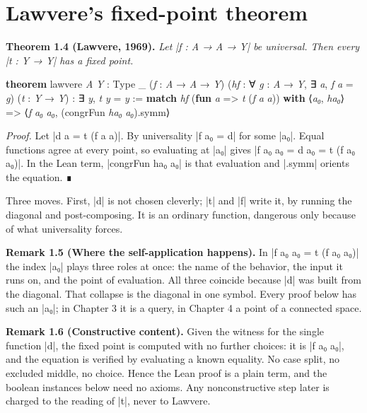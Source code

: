 \documentclass{memoir}
\begin{document}
\section{Lawvere's fixed-point theorem}\label{Two--Schemas--of--Impossibility-005F-005F-005F--Machine--Checked--Limits--of--Trustworthy--Machine--Learning-005F-005F-005F--and--Why--They--Tighten--with--Capability----The--Diagonal----Lawvere-005F-005F-005Fs--fixed--point--theorem}

\textbf{Theorem 1.4 (Lawvere, 1969).} \emph{Let \LeanVerb|f : A → A → Y| be universal. Then every
\LeanVerb|t : Y → Y| has a fixed point.}

\begin{LeanVerbatim}
\textbf{theorem} lawvere \textit{A} \textit{Y} : Type _ (\textit{f} : \textit{A} → \textit{A} → \textit{Y})
    (\textit{hf} : ∀ \textit{g} : \textit{A} → \textit{Y}, ∃ \textit{a}, \textit{f} \textit{a} = \textit{g})
    (\textit{t} : \textit{Y} → \textit{Y}) : ∃ \textit{y}, \textit{t} \textit{y} = \textit{y} :=
  \textbf{match} \textit{hf} (\textbf{fun} \textit{a} => \textit{t} (\textit{f} \textit{a} \textit{a})) \textbf{with}
   ⟨\textit{a₀}, \textit{ha₀}⟩ => ⟨\textit{f} \textit{a₀} \textit{a₀}, (congrFun \textit{ha₀} \textit{a₀}).symm⟩

\end{LeanVerbatim}


\emph{Proof.} Let \LeanVerb|d a = t (f a a)|. By universality \LeanVerb|f a₀ = d| for some \LeanVerb|a₀|. Equal
functions agree at every point, so evaluating at \LeanVerb|a₀| gives \LeanVerb|f a₀ a₀ = d a₀ = t (f a₀ a₀)|.
In the Lean term, \LeanVerb|congrFun ha₀ a₀| is that evaluation and \LeanVerb|.symm| orients the
equation. ∎

Three moves. First, \LeanVerb|d| is not chosen cleverly; \LeanVerb|t| and \LeanVerb|f| write it, by running
the diagonal and post-composing. It is an ordinary function, dangerous only
because of what universality forces.

\textbf{Remark 1.5 (Where the self-application happens).} In \LeanVerb|f a₀ a₀ = t (f a₀ a₀)| the
index \LeanVerb|a₀| plays three roles at once: the name of the behavior, the input it
runs on, and the point of evaluation. All three coincide because \LeanVerb|d| was built
from the diagonal. That collapse is the diagonal in one symbol. Every proof
below has such an \LeanVerb|a₀|; in Chapter 3 it is a query, in Chapter 4 a point of a
connected space.

\textbf{Remark 1.6 (Constructive content).} Given the witness for the single function
\LeanVerb|d|, the fixed point is computed with no further choices: it is \LeanVerb|f a₀ a₀|, and
the equation is verified by evaluating a known equality. No case split, no
excluded middle, no choice. Hence the Lean proof is a plain term, and the
boolean instances below need no axioms. Any nonconstructive step later is
charged to the reading of \LeanVerb|t|, never to Lawvere.
\end{document}
